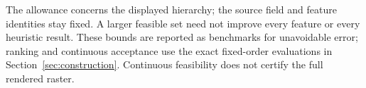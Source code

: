 The allowance concerns the displayed hierarchy; the source field and feature identities stay fixed. A larger feasible set need not improve every feature or every heuristic result. These bounds are reported as benchmarks for unavoidable error; ranking and continuous acceptance use the exact fixed-order evaluations in Section~\ref{sec:construction}. Continuous feasibility does not certify the full rendered raster.

